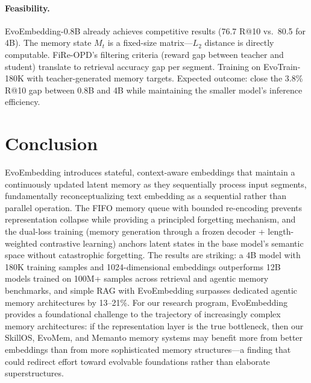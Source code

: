 \documentclass[11pt,a4paper]{article}
\begin{document}
\paragraph{Feasibility.} EvoEmbedding-0.8B already achieves competitive results (76.7 R@10 vs.\ 80.5 for 4B). The memory state $M_t$ is a fixed-size matrix---$L_2$ distance is directly computable. FiRe-OPD's filtering criteria (reward gap between teacher and student) translate to retrieval accuracy gap per segment. Training on EvoTrain-180K with teacher-generated memory targets. Expected outcome: close the 3.8\% R@10 gap between 0.8B and 4B while maintaining the smaller model's inference efficiency.

\section{Conclusion}

EvoEmbedding introduces stateful, context-aware embeddings that maintain a continuously updated latent memory as they sequentially process input segments, fundamentally reconceptualizing text embedding as a sequential rather than parallel operation. The FIFO memory queue with bounded re-encoding prevents representation collapse while providing a principled forgetting mechanism, and the dual-loss training (memory generation through a frozen decoder + length-weighted contrastive learning) anchors latent states in the base model's semantic space without catastrophic forgetting. The results are striking: a 4B model with 180K training samples and 1024-dimensional embeddings outperforms 12B models trained on 100M+ samples across retrieval and agentic memory benchmarks, and simple RAG with EvoEmbedding surpasses dedicated agentic memory architectures by 13--21\%. For our research program, EvoEmbedding provides a foundational challenge to the trajectory of increasingly complex memory architectures: if the representation layer is the true bottleneck, then our SkillOS, EvoMem, and Memanto memory systems may benefit more from better embeddings than from more sophisticated memory structures---a finding that could redirect effort toward evolvable foundations rather than elaborate superstructures.
\end{document}
